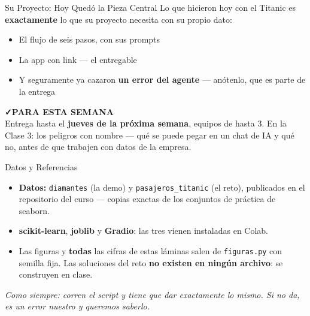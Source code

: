 \documentclass[aspectratio=169, 11pt]{beamer}
\begin{document}
\begin{frame}[shrink=5]{Su Proyecto: Hoy Quedó la Pieza Central}
  \vspace{4pt}
  {\footnotesize\color{textMuted}
   Lo que hicieron hoy con el Titanic es \textbf{exactamente} lo que su
   proyecto necesita con su propio dato:}
  \vspace{6pt}
  {\footnotesize\color{textMuted}
  \begin{itemize}\setlength{\itemsep}{5pt}
    \item[{\color{codeGreen}\scriptsize\faCheck}]
      El flujo de seis pasos, con sus prompts
    \item[{\color{codeGreen}\scriptsize\faCheck}]
      La app con link --- el entregable
    \item[{\color{codeGreen}\scriptsize\faCheck}]
      Y seguramente ya cazaron \textbf{un error del agente} --- anótenlo,
      que es parte de la entrega
  \end{itemize}}
  \vspace{7pt}
  \begin{tcolorbox}[colback=arcaGray, colframe=codeGreen, boxrule=0pt, leftrule=3pt,
    arc=3pt, left=8pt, right=8pt, top=5pt, bottom=5pt]
    {\scriptsize\color{codeGreen}\bfseries\faCheck\hspace{4pt}PARA ESTA SEMANA}\\[3pt]
    {\scriptsize\color{textMuted}
     Entrega hasta el \textbf{jueves de la próxima semana}, equipos de hasta
     3. En la Clase 3: los peligros con nombre --- qué se puede pegar en un
     chat de IA y qué no, antes de que trabajen con datos de la empresa.}
  \end{tcolorbox}
\end{frame}

\begin{frame}[shrink=8]{Datos y Referencias}
  \vspace{4pt}
  {\footnotesize\color{textMuted}
  \begin{itemize}\setlength{\itemsep}{5pt}
    \item[{\color{arcaRed}\scriptsize\faDatabase}]
      \textbf{Datos:} \texttt{diamantes} (la demo) y
      \texttt{pasajeros\_titanic} (el reto), publicados en el repositorio
      del curso --- copias exactas de los conjuntos de práctica de seaborn.
    \item[{\color{arcaRed}\scriptsize\faBook}]
      \textbf{scikit-learn}, \textbf{joblib} y \textbf{Gradio}: las tres
      vienen instaladas en Colab.
    \item[{\color{arcaRed}\scriptsize\faFileCode}]
      Las figuras y \textbf{todas} las cifras de estas láminas salen de
      \texttt{figuras.py} con semilla fija. Las soluciones del reto
      \textbf{no existen en ningún archivo}: se construyen en clase.
  \end{itemize}}
  \vspace{7pt}
  {\scriptsize\color{arcaDark}\itshape
   Como siempre: corren el script y tiene que dar exactamente lo mismo. Si
   no da, es un error nuestro y queremos saberlo.}
\end{frame}
\end{document}
